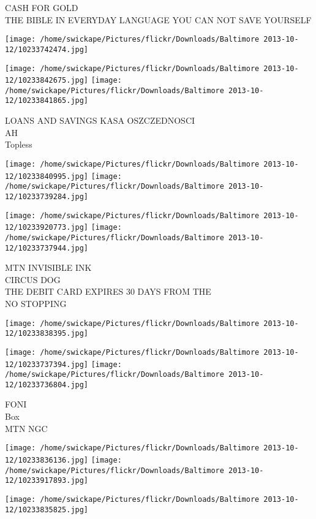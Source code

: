 \documentclass[10pt,letterpaper]{article}
\begin{document}
CASH FOR GOLD\\
THE BIBLE IN EVERYDAY LANGUAGE YOU CAN NOT SAVE YOURSELF
\pagebreak

\texttt{[image: /home/swickape/Pictures/flickr/Downloads/Baltimore 2013-10-12/10233742474.jpg]}

\vspace{0.25in}
\texttt{[image: /home/swickape/Pictures/flickr/Downloads/Baltimore 2013-10-12/10233842675.jpg]}
\texttt{[image: /home/swickape/Pictures/flickr/Downloads/Baltimore 2013-10-12/10233841865.jpg]}

LOANS AND SAVINGS KASA OSZCZEDNOSCI\\
AH\\
Topless
\pagebreak

\texttt{[image: /home/swickape/Pictures/flickr/Downloads/Baltimore 2013-10-12/10233840995.jpg]}
\texttt{[image: /home/swickape/Pictures/flickr/Downloads/Baltimore 2013-10-12/10233739284.jpg]}

\texttt{[image: /home/swickape/Pictures/flickr/Downloads/Baltimore 2013-10-12/10233920773.jpg]}
\texttt{[image: /home/swickape/Pictures/flickr/Downloads/Baltimore 2013-10-12/10233737944.jpg]}

MTN INVISIBLE INK\\
CIRCUS DOG\\
THE DEBIT CARD EXPIRES 30 DAYS FROM THE\\
NO STOPPING
\pagebreak

\texttt{[image: /home/swickape/Pictures/flickr/Downloads/Baltimore 2013-10-12/10233838395.jpg]}

\vspace{0.25in}
\texttt{[image: /home/swickape/Pictures/flickr/Downloads/Baltimore 2013-10-12/10233737394.jpg]}
\texttt{[image: /home/swickape/Pictures/flickr/Downloads/Baltimore 2013-10-12/10233736804.jpg]}

FONI\\
Box\\
MTN NGC
\pagebreak

\texttt{[image: /home/swickape/Pictures/flickr/Downloads/Baltimore 2013-10-12/10233836136.jpg]}
\texttt{[image: /home/swickape/Pictures/flickr/Downloads/Baltimore 2013-10-12/10233917893.jpg]}

\texttt{[image: /home/swickape/Pictures/flickr/Downloads/Baltimore 2013-10-12/10233835825.jpg]}
\end{document}
